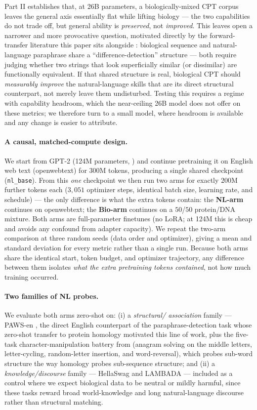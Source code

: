 
Part II establishes that, at 26B parameters, a biologically-mixed CPT corpus leaves the general
axis essentially flat while lifting biology --- the two capabilities do not trade off, but general
ability is \emph{preserved}, not \emph{improved}. This leaves open a narrower and more provocative
question, motivated directly by the forward-transfer literature this paper sits alongside
\citep{wang2026biopaws}: biological sequence and natural-language paraphrase share a
``difference-detection'' structure --- both require judging whether two strings that look
superficially similar (or dissimilar) are functionally equivalent. If that shared structure is
real, biological CPT should \emph{measurably improve} the natural-language skills that are its
direct structural counterpart, not merely leave them undisturbed. Testing this requires a regime
with capability headroom, which the near-ceiling 26B model does not offer on these metrics; we
therefore turn to a small model, where headroom is available and any change is easier to attribute.

\paragraph{A causal, matched-compute design.} We start from GPT-2 (124M parameters,
\citealp{radford2019gpt2}) and continue pretraining it on English web text (openwebtext) for
$300$M tokens, producing a single shared checkpoint (\texttt{nl\_base}). From this \emph{one}
checkpoint we then run two arms for exactly $200$M further tokens each ($3{,}051$ optimizer
steps, identical batch size, learning rate, and schedule) --- the only difference is what the
extra tokens contain: the \textbf{NL-arm} continues on openwebtext; the \textbf{Bio-arm}
continues on a $50$/$50$ protein/DNA mixture. Both arms are full-parameter finetunes (no LoRA;
at 124M this is cheap and avoids any confound from adapter capacity). We repeat the two-arm
comparison at three random seeds (data order and optimizer), giving a mean and standard deviation
for every metric rather than a single run. Because both arms share the identical start, token
budget, and optimizer trajectory, any difference between them isolates \emph{what the extra
pretraining tokens contained}, not how much training occurred.

\paragraph{Two families of NL probes.} We evaluate both arms zero-shot on: (i) a \emph{structural/
association} family --- PAWS-en \citep{yang2019pawsx}, the direct English counterpart of the
paraphrase-detection task whose zero-shot transfer to protein homology motivated this line of
work, plus the five-task character-manipulation battery from \citet{brown2020gpt3} (anagram
solving on the middle letters, letter-cycling, random-letter insertion, and word-reversal), which
probes sub-word structure the way homology probes sub-sequence structure; and (ii) a
\emph{knowledge/discourse} family --- HellaSwag and LAMBADA --- included as a control where we
expect biological data to be neutral or mildly harmful, since these tasks reward broad
world-knowledge and long natural-language discourse rather than structural matching.

